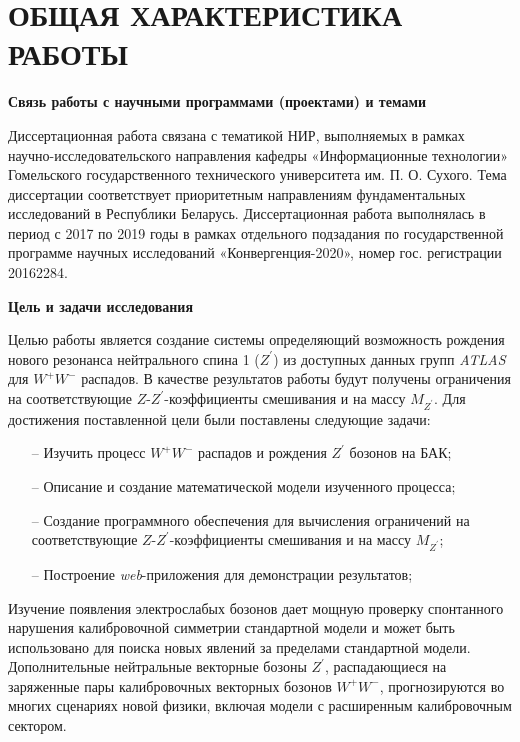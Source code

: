 \chapter*{ОБЩАЯ ХАРАКТЕРИСТИКА РАБОТЫ}
\textbf{Связь работы с научными программами (проектами) и темами}

Диссертационная работа связана с тематикой НИР, выполняемых в рамках научно-исследовательского направления кафедры «Информационные технологии» Гомельского государственного технического университета им. П. О. Сухого.
Тема диссертации соответствует приоритетным направлениям
фундаментальных исследований в Республики Беларусь. Диссертационная
работа выполнялась в период с 2017 по 2019 годы в рамках отдельного
подзадания по государственной программе научных исследований
«Конвергенция-2020», номер гос. регистрации 20162284.

\textbf{Цель и задачи исследования}

Целью работы является создание системы определяющий возможность рождения нового резонанса нейтрального спина 1 (${Z}^{\prime}$) 
из доступных данных групп \textit{ATLAS} для ${W}^{+}{W}^{-}$ распадов. В качестве результатов работы будут получены 
ограничения на соответствующие $Z$-${Z}^{\prime}$-коэффициенты смешивания и на массу $M_{Z^\prime}$.
Для достижения поставленной цели были поставлены следующие задачи:

\begin{itemize}
	\item[--] Изучить процесс ${W}^{+}{W}^{-}$ распадов и рождения ${Z}^{\prime}$ бозонов на БАК;
	
	\item[--] Описание и создание математической модели изученного процесса;
	
	\item[--] Создание программного обеспечения для вычисления ограничений на соответствующие $Z$-${Z}^{\prime}$-коэффициенты смешивания и на массу $M_{Z^\prime}$;
	
	\item[--] Построение \textit{web}-приложения для демонстрации результатов;
	
\end{itemize}

Изучение появления электрослабых бозонов дает мощную проверку спонтанного нарушения 
калибровочной симметрии стандартной модели и может быть использовано для поиска новых явлений за пределами стандартной модели. 
Дополнительные нейтральные векторные бозоны ${Z}^{\prime}$, распадающиеся на заряженные пары калибровочных векторных бозонов ${W}^{+}{W}^{-}$, 
прогнозируются во многих сценариях новой физики, включая модели с расширенным калибровочным сектором.

